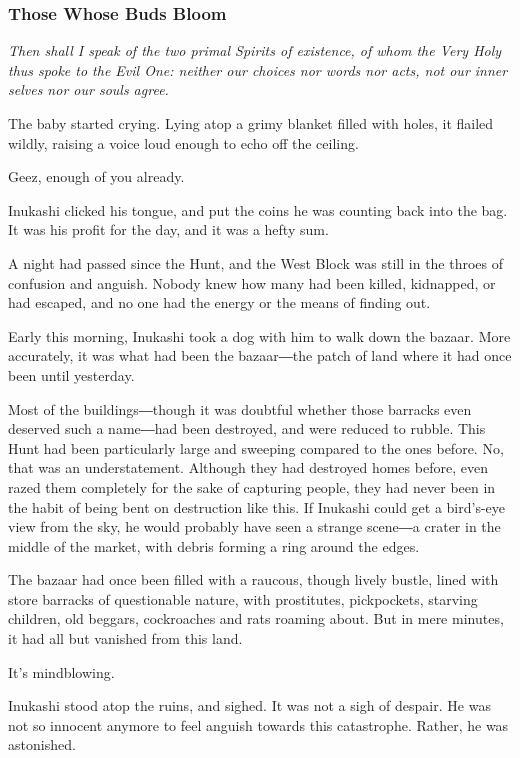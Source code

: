 \subsubsection{Those Whose Buds Bloom}

\emph{Then shall I speak of the two primal Spirits of existence, of whom
the Very Holy thus spoke to the Evil One: neither our choices nor words
nor acts, not our inner selves nor our souls agree.~}

The baby started crying. Lying atop a grimy blanket filled with holes,
it flailed wildly, raising a voice loud enough to echo off the ceiling.

Geez, enough of you already.

Inukashi clicked his tongue, and put the coins he was counting back into
the bag. It was his profit for the day, and it was a hefty sum.

A night had passed since the Hunt, and the West Block was still in the
throes of confusion and anguish. Nobody knew how many had been killed,
kidnapped, or had escaped, and no one had the energy or the means of
finding out.

Early this morning, Inukashi took a dog with him to walk down the
bazaar. More accurately, it was what had been the bazaar―the patch of
land where it had once been until yesterday.

Most of the buildings―though it was doubtful whether those barracks even
deserved such a name―had been destroyed, and were reduced to rubble.
This Hunt had been particularly large and sweeping compared to the ones
before. No, that was an understatement. Although they had destroyed
homes before, even razed them completely for the sake of capturing
people, they had never been in the habit of being bent on destruction
like this. If Inukashi could get a bird's-eye view from the sky, he
would probably have seen a strange scene―a crater in the middle of the
market, with debris forming a ring around the edges.

The bazaar had once been filled with a raucous, though lively bustle,
lined with store barracks of questionable nature, with prostitutes,
pickpockets, starving children, old beggars, cockroaches and rats
roaming about. But in mere minutes, it had all but vanished from this
land.

It's mindblowing.

Inukashi stood atop the ruins, and sighed. It was not a sigh of despair.
He was not so innocent anymore to feel anguish towards this catastrophe.
Rather, he was astonished.

